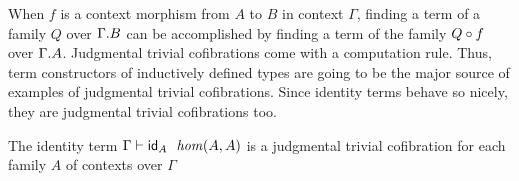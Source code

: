 When $f$ is a context morphism from $A$ to $B$ in context $\Gamma$, 
finding a term of a family $Q$ over $\ctxext{\Gamma}{B}$ can be accomplished
by finding a term of the family $\jcomp{A}{f}{Q}$ over $\ctxext{\Gamma}{A}$.
Judgmental trivial cofibrations come with a computation rule. Thus, term
constructors of inductively defined types are going to be the major source of
examples of judgmental trivial cofibrations. Since identity terms behave
so nicely, they are judgmental trivial cofibrations too.

\begin{lem}
The identity term
$\jhom{\Gamma}{A}{A}{\idtm{A}}$ is a judgmental trivial cofibration
for each family $A$ of contexts over $\Gamma$
\end{lem}

